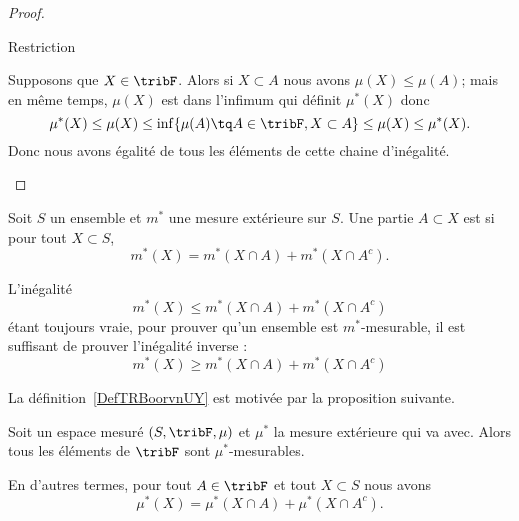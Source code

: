 \begin{proof}
\begin{subproof}
    \item[Restriction]

    Supposons que \( X\in\tribF\). Alors si \( X\subset A\) nous avons \( \mu(X)\leq \mu(A)\); mais en même temps, \( \mu(X)\) est dans l'infimum qui définit \( \mu^*(X)\) donc
    \begin{equation}
        \mu^*(X)\leq\mu(X)\leq \inf \{ \mu(A)\tq A\in\tribF,X\subset A \}\leq \mu(X)\leq\mu^*(X).
    \end{equation}
    Donc nous avons égalité de tous les éléments de cette chaine d'inégalité.
    \end{subproof}
\end{proof}

\begin{definition}  \label{DefTRBoorvnUY}
    Soit \( S\) un ensemble et \( m^*\) une mesure extérieure sur \( S\). Une partie \( A\subset X\) est  si pour tout \( X\subset S\),
    \begin{equation}
        m^*(X)=m^*(X\cap A)+m^*(X\cap A^c).
    \end{equation}
\end{definition}

\begin{remark}
    L'inégalité
    \begin{equation}
        m^*(X)\leq m^*(X\cap A)+m^*(X\cap A^c)
    \end{equation}
    étant toujours vraie, pour prouver qu'un ensemble est \( m^*\)-mesurable, il est suffisant de prouver l'inégalité inverse :
    \begin{equation}
        m^*(X)\geq m^*(X\cap A)+m^*(X\cap A^c)
    \end{equation}
\end{remark}
La définition~\ref{DefTRBoorvnUY} est motivée par la proposition suivante.

\begin{proposition} \label{PropOJFoozSKAE}
    Soit un espace mesuré \( (S,\tribF,\mu)\) et \( \mu^*\) la mesure extérieure qui va avec. Alors tous les éléments de \( \tribF\) sont \( \mu^*\)-mesurables.

    En d'autres termes, pour tout \( A\in\tribF\) et tout \( X\subset S\) nous avons
    \begin{equation}
        \mu^*(X)=\mu^*(X\cap A)+\mu^*(X\cap A^c).
    \end{equation}
\end{proposition}

